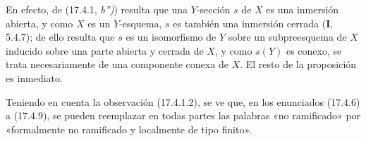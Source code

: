 En efecto, de (17.4.1, \emph{b'')}) resulta que una $Y$-sección $s$ de $X$ es una inmersión abierta, y como $X$ es un $Y$-esquema, $s$ es también una inmersión cerrada (\textbf I, 5.4.7); de ello resulta que $s$ es un isomorfismo de $Y$ sobre un subpreesquema de $X$ inducido sobre una parte abierta y cerrada de $X$, y como $s(Y)$ es conexo, se trata necesariamente de una componente conexa de $X$. El resto de la proposición es inmediato.

\begin{remark}[17.4.10]
\label{IV.17.4.10}
Teniendo en cuenta la observación (17.4.1.2), se ve que, en los enunciados (17.4.6) a (17.4.9), se pueden reemplazar en todas partes las palabras «no ramificado» por «formalmente no ramificado y localmente de tipo finito».
\end{remark}
